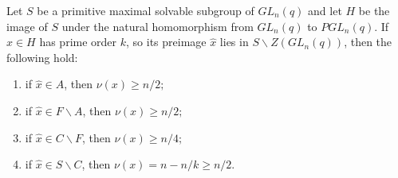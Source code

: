\begin{Lem}\label{6}
 Let $S$  be a primitive maximal  solvable subgroup of $GL_n(q)$ and let $H$  be the image of $S$ under the natural homomorphism from $GL_n(q)$ to $PGL_n(q).$ If $x \in H$ has prime order $k$, so its preimage  $\hat{x}$ lies in $S \backslash Z(GL_n(q))$, then %
the following hold:
\begin{enumerate}[font=\normalfont]
\item if $\hat{x} \in A$, then $\nu(x) \ge n/2; $ \label{6it1}
\item if $\hat{x}  \in F \backslash A$, then $\nu(x) \ge n/2; $ \label{6it2}
\item if $\hat{x}  \in C \backslash F$, then $\nu(x) \ge n/4; $ \label{6it3}
\item if $\hat{x}  \in S \backslash C$, then $\nu(x)=n-n/k \ge n/2. $ \label{6it4}
\end{enumerate}
\end{Lem}

